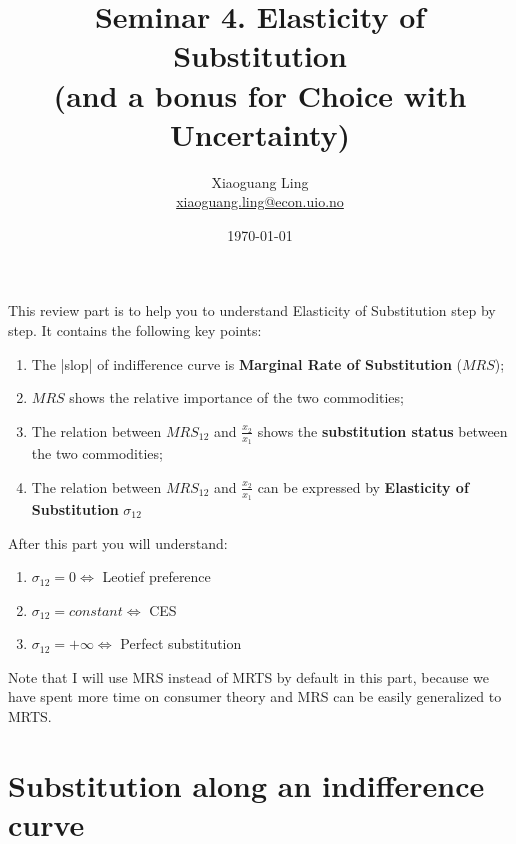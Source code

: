 \documentclass{article}
\title{Seminar 4. Elasticity of Substitution  \\
\large (and a bonus for Choice with Uncertainty)}
\author{Xiaoguang Ling \\  \href{xiaoguang.ling@econ.uio.no}{xiaoguang.ling@econ.uio.no}}
\date{\today}
\begin{document}
\maketitle

\begin{mdframed}[backgroundcolor=blue!20,linecolor=white]

This review part is to help you to understand Elasticity of Substitution step by step.
It contains the following key points:

\begin{enumerate}
\item The |slop| of indifference curve is \textbf{Marginal Rate of Substitution} ($MRS$);
\item $MRS$ shows the relative importance of the two commodities;
\item The relation between $MRS_{12}$ and $\frac{x_2}{x_1}$ shows the \textbf{substitution status} between the two commodities;
\item The relation between $MRS_{12}$ and $\frac{x_2}{x_1}$ can be expressed by \textbf{Elasticity of Substitution} $\sigma_{12}$
\end{enumerate}

After this part you will understand:

\begin{enumerate}
\item $\sigma_{12} = 0 \iff$ Leotief preference
\item $\sigma_{12} = constant \iff$ CES
\item $\sigma_{12} = + \infty \iff$ Perfect substitution
\end{enumerate}

Note that I will use MRS instead of MRTS by default in this part, because we have spent more time on consumer theory and MRS
can be easily generalized to MRTS.

\section{Substitution along an indifference curve}
\begin{center}
\end{center}
\end{mdframed}
\end{document}

